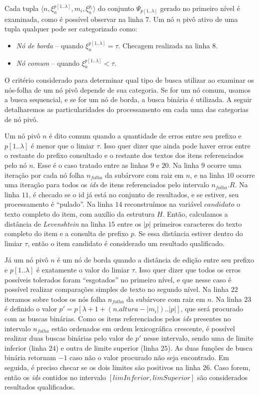 Cada tupla $\langle n, \xi_{n}^{p[1..\lambda]}, m_{i}, \xi_{n}^{p_{i}} \rangle$ do conjunto $\Psi_{p[1..\lambda]}$ gerado no primeiro nível é examinada, como é possível observar na linha $7$. Um nó $n$ pivô ativo de uma tupla qualquer pode ser categorizado como:
\begin{itemize}
    \item \textit{Nó de borda} -- quando $\xi_{n}^{p[1..\lambda]} = \tau$. Checagem realizada na linha $8$.
    \item \textit{Nó comum} -- quando $\xi_{n}^{p[1..\lambda]} < \tau$.
\end{itemize}

O critério considerado para determinar qual tipo de busca utilizar ao examinar os nós-folha de um nó pivô depende de sua categoria. Se for um nó comum, usamos a busca sequencial, e se for um nó de borda, a busca binária é utilizada. A seguir detalharemos as particularidades do processamento em cada uma das categorias de nó pivô.

Um nó pivô $n$ é dito comum quando a quantidade de erros entre seu prefixo e $p[1..\lambda]$ é menor que o limiar $\tau$. Isso quer dizer que ainda pode haver erros entre o restante do prefixo consultado e o restante dos textos dos itens referenciados pelo nó $n$. Esse é o caso tratado entre as linhas $9$ e $20$. Na linha $9$ ocorre uma iteração por cada nó folha $n_{folha}$ da subárvore com raiz em $n$, e na linha $10$ ocorre uma iteração para todos os \textit{ids} de itens referenciados pelo intervalo $n_{folha}.R$. Na linha $11$, é checado se o id já está no conjunto de resultados, e se estiver, seu processamento é ``pulado''. Na linha $14$ reconstruímos na variável $candidato$ o texto completo do item, com auxílio da estrutura $H$. Então, calculamos a distância de \textit{Levenshtein} na linha $15$ entre os $|p|$ primeiros caracteres do texto completo do item e a consulta de prefixo $p$. Se essa distância estiver dentro do limiar $\tau$, então o item candidato é considerado um resultado qualificado.

Já um nó pivô $n$ é um nó de borda quando a distância de edição entre seu prefixo e $p[1..\lambda]$ é exatamente o valor do limiar $\tau$. Isso quer dizer que todos os erros possíveis tolerados foram ``esgotados'' no primeiro nível, e que nesse caso é possível realizar comparações simples de texto no segundo nível. Na linha $22$ iteramos sobre todos os nós folha $n_{folha}$ da subárvore com raiz em $n$. Na linha $23$ é definido o valor $p' = p[\lambda+1+ (n.altura - |m_{i}|)..|p|]$, que será procurado com as buscas binárias. Como os itens referenciados pelos \textit{ids} presentes no intervalo $n_{folha}$ estão ordenados em ordem lexicográfica crescente, é possível realizar duas buscas binárias pelo valor de $p'$ nesse intervalo, sendo uma de limite inferior (linha $24$) e outra de limite superior (linha $25$). As duas funções de busca binária retornam $-1$ caso não o valor procurado não seja encontrado. Em seguida, é preciso checar se os dois limites são positivos na linha $26$. Caso forem, então os \textit{ids} contidos no intervalo $[limInferior, limSuperior]$ são considerados resultados qualificados.
